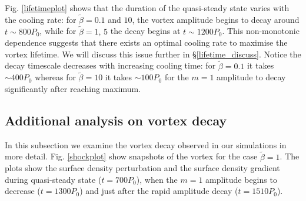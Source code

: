 Fig. \ref{lifetimeplot} shows that the duration of the quasi-steady state
varies with the cooling rate: for 
$\tilde{\beta}=0.1$ and $10$, the vortex amplitude begins to decay around
$t\sim800P_0$, while for $\tilde{\beta}=1,\,5$ the decay begins at 
$t\sim1200P_0$. This non-monotonic dependence suggests that there
exists an optimal cooling rate to maximise the vortex lifetime. We
will discuss this issue further in 
\S\ref{lifetime_discuss}. Notice the decay timescale decreases with
increasing cooling time: for $\tilde{\beta}=0.1$ it takes $\sim400P_0$
whereas for $\tilde{\beta}=10$ it takes $\sim 100P_0$ for the $m=1$
amplitude to decay significantly after reaching maximum. 











\subsection{Additional analysis on vortex decay}
In this subsection we examine the vortex decay observed in our
simulations in more detail. Fig. \ref{shockplot} show snapshots
of the vortex for the case $\tilde{\beta}=1$. The plots show the surface
density perturbation and the surface density gradient during
quasi-steady state ($t=700P_0$), when the $m=1$ amplitude begins to
decrease ($t=1300P_0$) and just after the rapid amplitude decay
($t=1510P_0$). 

